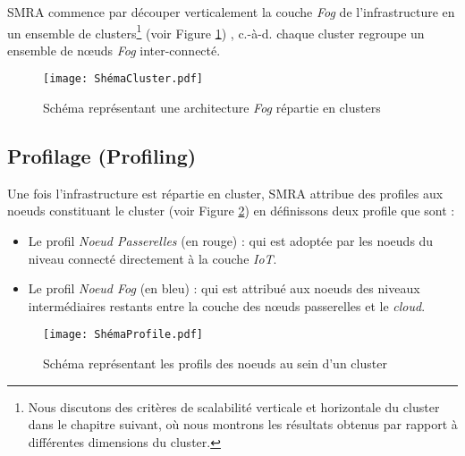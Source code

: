 \par SMRA commence par découper verticalement la couche \emph{Fog} de l'infrastructure en un ensemble de clusters\footnote{Nous discutons des critères de scalabilité verticale et horizontale du cluster dans le chapitre suivant, où nous montrons les résultats obtenus par rapport à différentes dimensions du cluster.} (voir Figure \ref{fig:Infrastructure_fog_repartie_en_cluster}) , c.-à-d. chaque cluster regroupe un ensemble de nœuds \emph{Fog} inter-connecté.



\begin{figure}[H]
    \centering
    \texttt{[image: ShémaCluster.pdf]}
    \caption{Schéma représentant une architecture \emph{Fog} répartie en clusters}
    \label{fig:Infrastructure_fog_repartie_en_cluster}
\end{figure}



\subsection{Profilage (Profiling)}
Une fois l'infrastructure est répartie en cluster, SMRA attribue des profiles aux noeuds constituant le cluster (voir Figure \ref{fig:profilage}) en définissons deux profile que sont :
\begin{itemize}
  \item Le profil \emph{Noeud Passerelles} (en rouge) : qui est adoptée par les noeuds du niveau connecté directement à la couche \emph{IoT}.
  \item Le profil \emph{Noeud Fog} (en bleu) : qui est attribué aux noeuds des niveaux intermédiaires restants entre la couche des nœuds passerelles et le \emph{cloud}. 
\end{itemize}



\begin{figure}[H]
  \centering
  \texttt{[image: ShémaProfile.pdf]}
  \caption{Schéma représentant les profils des noeuds au sein d'un cluster}
  \label{fig:profilage}
\end{figure}



